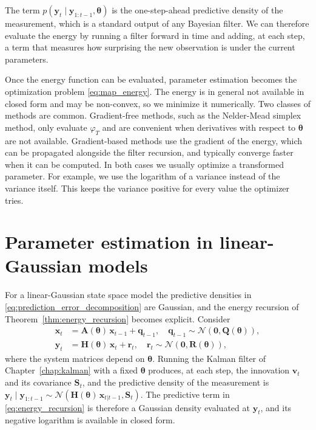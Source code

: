 The term $p(\mathbf{y}_t \mid \mathbf{y}_{1:t-1}, \boldsymbol{\theta})$ is the one-step-ahead predictive density of the measurement, which is a standard output of any Bayesian filter. We can therefore evaluate the energy by running a filter forward in time and adding, at each step, a term that measures how surprising the new observation is under the current parameters.

Once the energy function can be evaluated, parameter estimation becomes the optimization problem \eqref{eq:map_energy}. The energy is in general not available in closed form and may be non-convex, so we minimize it numerically. Two classes of methods are common. Gradient-free methods, such as the Nelder-Mead simplex method, only evaluate $\varphi_T$ and are convenient when derivatives with respect to $\boldsymbol{\theta}$ are not available. Gradient-based methods use the gradient of the energy, which can be propagated alongside the filter recursion, and typically converge faster when it can be computed. In both cases we usually optimize a transformed parameter. For example, we use the logarithm of a variance instead of the variance itself. This keeps the variance positive for every value the optimizer tries.


\section{Parameter estimation in linear-Gaussian models}
For a linear-Gaussian state space model the predictive densities in \eqref{eq:prediction_error_decomposition} are Gaussian, and the energy recursion of Theorem~\ref{thm:energy_recursion} becomes explicit. Consider
\begin{equation}\label{eq:lin_gauss_param}
    \begin{aligned}
        \mathbf{x}_t &= \mathbf{A}(\boldsymbol{\theta})\,\mathbf{x}_{t-1} + \mathbf{q}_{t-1}, \quad \mathbf{q}_{t-1} \sim \mathcal{N}(\mathbf{0}, \mathbf{Q}(\boldsymbol{\theta})), \\
        \mathbf{y}_t &= \mathbf{H}(\boldsymbol{\theta})\,\mathbf{x}_t + \mathbf{r}_t, \quad \mathbf{r}_t \sim \mathcal{N}(\mathbf{0}, \mathbf{R}(\boldsymbol{\theta})),
    \end{aligned}
\end{equation}
where the system matrices depend on $\boldsymbol{\theta}$. Running the Kalman filter of Chapter~\ref{chap:kalman} with a fixed $\boldsymbol{\theta}$ produces, at each step, the innovation $\mathbf{v}_t$ and its covariance $\mathbf{S}_t$, and the predictive density of the measurement is $\mathbf{y}_t \mid \mathbf{y}_{1:t-1} \sim \mathcal{N}(\mathbf{H}(\boldsymbol{\theta})\,\mathbf{x}_{t|t-1}, \mathbf{S}_t)$. The predictive term in \eqref{eq:energy_recursion} is therefore a Gaussian density evaluated at $\mathbf{y}_t$, and its negative logarithm is available in closed form.

